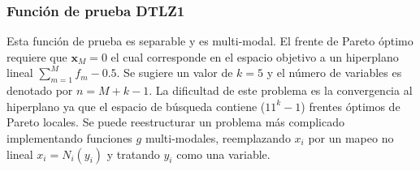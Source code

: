 \subsubsection*{Función de prueba DTLZ1}
Esta función de prueba es separable y es multi-modal.
%
El frente de Pareto óptimo requiere que $\mathbf{x}_M = 0$ el cual corresponde en el espacio objetivo a un hiperplano lineal $\sum_{m=1}^M f_m - 0.5$.
%
Se sugiere un valor de $k=5$ y el número de variables es denotado por $n=M+k-1$.
%
La dificultad de este problema es la convergencia al hiperplano ya que el espacio de búsqueda contiene ($11^k - 1$) frentes óptimos de Pareto locales.
%
Se puede reestructurar un problema más complicado implementando funciones $g$ multi-modales, reemplazando $x_i$ por un mapeo no lineal $x_i= N_i(y_i)$ y tratando $y_i$ como una variable. 

